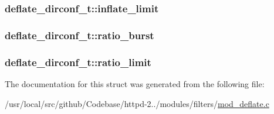 \subsubsection[{\texorpdfstring{inflate\+\_\+limit}{inflate_limit}}]{ deflate\+\_\+dirconf\+\_\+t\+::inflate\+\_\+limit}\hypertarget{structdeflate__dirconf__t_a61388190747e1bbf2e195e78cf173425}{}\label{structdeflate__dirconf__t_a61388190747e1bbf2e195e78cf173425}
\subsubsection[{\texorpdfstring{ratio\+\_\+burst}{ratio_burst}}]{ deflate\+\_\+dirconf\+\_\+t\+::ratio\+\_\+burst}\hypertarget{structdeflate__dirconf__t_ad53c40a9f3e4360c25072f558355c068}{}\label{structdeflate__dirconf__t_ad53c40a9f3e4360c25072f558355c068}
\subsubsection[{\texorpdfstring{ratio\+\_\+limit}{ratio_limit}}]{ deflate\+\_\+dirconf\+\_\+t\+::ratio\+\_\+limit}\hypertarget{structdeflate__dirconf__t_a7d1a1f466fec237305259171a6588a4a}{}\label{structdeflate__dirconf__t_a7d1a1f466fec237305259171a6588a4a}


The documentation for this struct was generated from the following file\+:\begin{DoxyCompactItemize}
\item 
/usr/local/src/github/\+Codebase/httpd-\/2../modules/filters/\hyperlink{mod__deflate_8c}{mod\+\_\+deflate.\+c}\end{DoxyCompactItemize}
